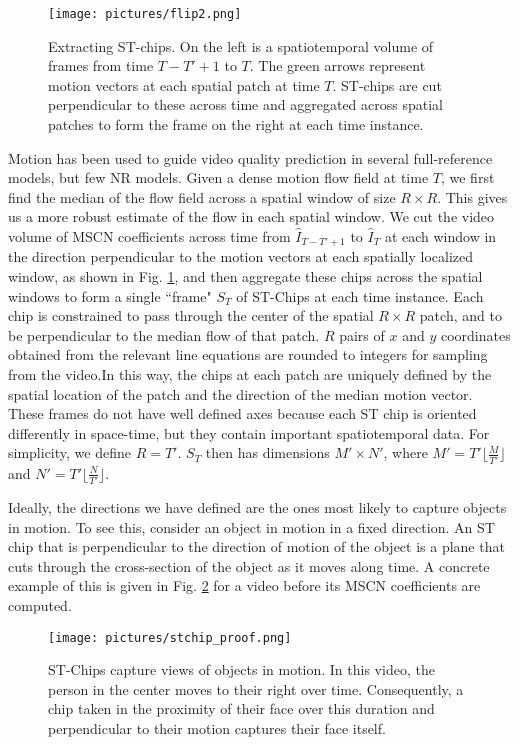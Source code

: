 \documentclass[conference]{IEEEtran}
\begin{document}
\begin{figure}
  \texttt{[image: pictures/flip2.png]}
  \caption{Extracting ST-chips. On the left is a spatiotemporal volume of frames from time $T-T'+1$ to $T$. The green arrows represent motion vectors at each spatial patch at time $T$. ST-chips are cut perpendicular to these across time and aggregated across spatial patches to form the frame on the right at each time instance.}\label{fig:stchip}
\end{figure}

Motion has been used to guide video quality prediction in several full-reference models\cite{movie,motionstruct,frof}, but few NR models\cite{vbliinds,nrof}. Given a dense motion flow field at time $T$, we first find the median of the flow field across a spatial window of size $R \times R$. This gives us a more robust estimate of  the flow in each spatial window. We cut the video volume of MSCN coefficients across time from $\hat{I}_{T-T'+1}$ to $\hat{I}_T$ at each window in the direction perpendicular to the motion vectors at each spatially localized window, as shown in Fig. \ref{fig:stchip}, and then aggregate these chips across the spatial windows to form a single ``frame" $S_T$ of ST-Chips at each time instance. Each chip is constrained to pass through the center of the spatial $R\times R$ patch, and to be perpendicular to the median flow of that patch. $R$ pairs of $x$ and $y$ coordinates obtained from the relevant line equations are rounded to integers for sampling from the video.In this way, the chips at each patch are uniquely defined by the spatial location of the patch and the direction of the median motion vector. These frames do not have well defined axes because each ST chip is oriented differently in space-time, but they contain important spatiotemporal data. For simplicity, we define $R=T'$. $S_T$ then has dimensions $ M' \times N'$, where $M'=T'\lfloor \frac{M}{T'} \rfloor$ and $N'= T' \lfloor \frac{N}{T'}\rfloor$.

Ideally, the directions we have defined are the ones most likely to capture objects in motion. To see this, consider an object in motion in a fixed direction. An ST chip that is perpendicular to the direction of motion of the object is a plane that cuts through the cross-section of the object as it moves along time. A concrete example of this is given in Fig. \ref{fig:proof} for a video before its MSCN coefficients are computed.

\begin{figure} 
  \texttt{[image: pictures/stchip\_proof.png]}
  \caption{ST-Chips capture views of objects in motion. In this video, the person in the center moves to their right over time. Consequently, a chip taken in the proximity of their face over this duration and perpendicular to their motion captures their face itself.}\label{fig:proof}
\end{figure}
\end{document}
